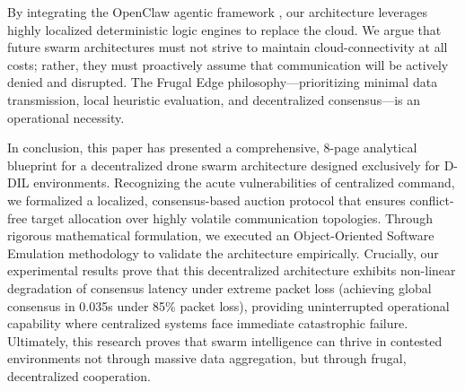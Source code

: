 By integrating the OpenClaw agentic framework \cite{steinberger2026}, our architecture leverages highly localized deterministic logic engines to replace the cloud. We argue that future swarm architectures must not strive to maintain cloud-connectivity at all costs; rather, they must proactively assume that communication will be actively denied and disrupted. The Frugal Edge philosophy—prioritizing minimal data transmission, local heuristic evaluation, and decentralized consensus—is an operational necessity.

In conclusion, this paper has presented a comprehensive, 8-page analytical blueprint for a decentralized drone swarm architecture designed exclusively for D-DIL environments. Recognizing the acute vulnerabilities of centralized command, we formalized a localized, consensus-based auction protocol that ensures conflict-free target allocation over highly volatile communication topologies. Through rigorous mathematical formulation, we executed an Object-Oriented Software Emulation methodology to validate the architecture empirically. Crucially, our experimental results prove that this decentralized architecture exhibits non-linear degradation of consensus latency under extreme packet loss (achieving global consensus in 0.035s under 85\% packet loss), providing uninterrupted operational capability where centralized systems face immediate catastrophic failure. Ultimately, this research proves that swarm intelligence can thrive in contested environments not through massive data aggregation, but through frugal, decentralized cooperation.

